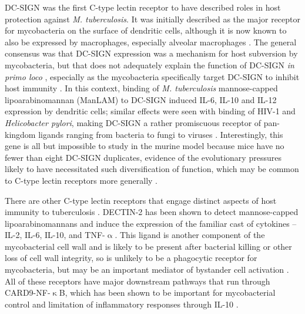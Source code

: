 DC\hyp{}SIGN was the first C\hyp{}type lectin receptor to have described roles in host protection against \textit{M. tuberculosis}. It was initially described as the major receptor for mycobacteria on the surface of dendritic cells, although it is now known to also be expressed by macrophages, especially alveolar macrophages \citep{Geijtenbeek2002, Tailleux2003, Tailleux2005}. The general consensus was that DC\hyp{}SIGN expression was a mechanism for host subversion by mycobacteria, but that does not adequately explain the function of DC\hyp{}SIGN \textit{in primo loco} \citep{vanKooyk2003}, especially as the mycobacteria specifically target DC-SIGN to inhibit host immunity \citep{Geijtenbeek2003}. In this context, binding of \textit{M. tuberculosis} mannose-capped lipoarabinomannan (ManLAM) \citep{Koppel2004, Maeda2003, Pitarque2005} to DC\hyp{}SIGN induced IL\hyp{}6, IL\hyp{}10 and IL\hyp{}12 expression by dendritic cells; similar effects were seen with binding of HIV\hyp{}1 and \textit{Helicobacter pylori}, making DC\hyp{}SIGN a rather promiscuous receptor of pan\hyp{}kingdom ligands ranging from bacteria to fungi to viruses \citep{Gringhuis2009, denDunnen2009}. Interestingly, this gene is all but impossible to study in the murine model because mice have no fewer than eight DC\hyp{}SIGN duplicates, evidence of the evolutionary pressures likely to have necessitated such diversification of function, which may be common to C-type lectin receptors more generally \citep{Tanne2009, GarciaVallejo2013}.

There are other C\hyp{}type lectin receptors that engage distinct aspects of host immunity to tuberculosis \citep{Mishra2017a}. DECTIN\hyp{}2 has been shown to detect mannose\hyp{}capped lipoarabinomannans and induce the expression of the familiar cast of cytokines -- IL\hyp{}2, IL\hyp{}6, IL\hyp{}10, and TNF\hyp{}$\upalpha$. This ligand is another component of the mycobacterial cell wall and is likely to be present after bacterial killing or other loss of cell wall integrity, so is unlikely to be a phagocytic receptor for mycobacteria, but may be an important mediator of bystander cell activation \citep{Marakalala2017}. All of these receptors have major downstream pathways that run through CARD9\hyp{}NF\hyp{}$\upkappa$B, which has been shown to be important for mycobacterial control and limitation of inflammatory responses through IL\hyp{}10 \citep{Dorhoi2010}.

